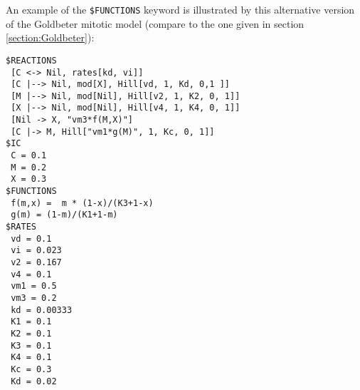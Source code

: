 An example of the {\tt \$FUNCTIONS} keyword is illustrated by this alternative version of the Goldbeter mitotic model (compare to the one given in section \ref{section:Goldbeter}): 

\begin{Verbatim}[frame=single]
$REACTIONS
 [C <-> Nil, rates[kd, vi]]
 [C |--> Nil, mod[X], Hill[vd, 1, Kd, 0,1 ]]
 [M |--> Nil, mod[Nil], Hill[v2, 1, K2, 0, 1]]
 [X |--> Nil, mod[Nil], Hill[v4, 1, K4, 0, 1]]
 [Nil -> X, "vm3*f(M,X)"]
 [C |-> M, Hill["vm1*g(M)", 1, Kc, 0, 1]]
$IC
 C = 0.1
 M = 0.2
 X = 0.3
$FUNCTIONS
 f(m,x) =  m * (1-x)/(K3+1-x)
 g(m) = (1-m)/(K1+1-m)
$RATES
 vd = 0.1
 vi = 0.023
 v2 = 0.167
 v4 = 0.1
 vm1 = 0.5
 vm3 = 0.2
 kd = 0.00333
 K1 = 0.1
 K2 = 0.1
 K3 = 0.1
 K4 = 0.1
 Kc = 0.3
 Kd = 0.02
\end{Verbatim}